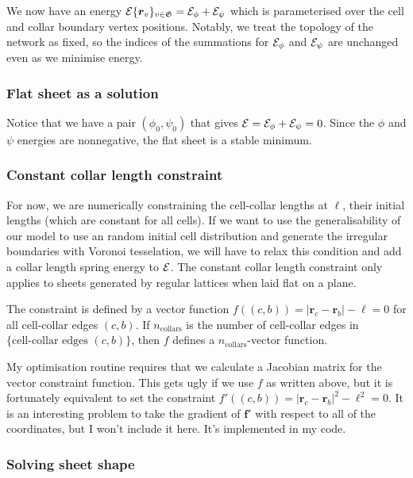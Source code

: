 
We now have an energy $\mathcal{E}\{ \bm{r}_v \}_{v \in \mathfrak{G}} = \mathcal{E}_\phi + \mathcal{E}_\psi$ which is parameterised over the cell and collar boundary vertex positions. Notably, we treat the topology of the network as fixed, so the indices of the summations for $\mathcal{E}_\phi$ and $\mathcal{E}_\psi$ are unchanged even as we minimise energy.

\subsubsection{Flat sheet as a solution} \label{subsubsec:flat}

Notice that we have a pair $(\phi_0, \psi_0)$ that gives $\mathcal{E} = \mathcal{E}_\phi + \mathcal{E}_\psi = 0$. Since the $\phi$ and $\psi$ energies are nonnegative, the flat sheet is a stable minimum. 

\subsubsection{Constant collar length constraint}

For now, we are numerically constraining the cell-collar lengths at $\ell$, their initial lengths (which are constant for all cells). If we want to use the generalisability of our model to use an random initial cell distribution and generate the irregular boundaries with Voronoi tesselation, we will have to relax this condition and add a collar length spring energy to $\mathcal{E}$. The constant collar length constraint only applies to sheets generated by regular lattices when laid flat on a plane.


The constraint is defined by a vector function $f((c, b)) = |\bm{r}_c - \bm{r}_b| - \ell = 0$ for all cell-collar edges $(c, b)$. If $n_{\text{collars}}$ is the number of cell-collar edges in $\{\text{cell-collar edges }(c,b) \}$, then $f$ defines a $n_{\text{collars}}$-vector function. 

My optimisation routine requires that we calculate a Jacobian matrix for the vector constraint function. This gets ugly if we use $f$ as written above, but it is fortunately equivalent to set the constraint $f'((c, b)) = |\bm{r}_c - \bm{r}_b|^2 - \ell^2 = 0$. It is an interesting problem to take the gradient of $\bm{f'}$ with respect to all of the coordinates, but I won't include it here. It's implemented in my code.

\subsubsection{Solving sheet shape}

